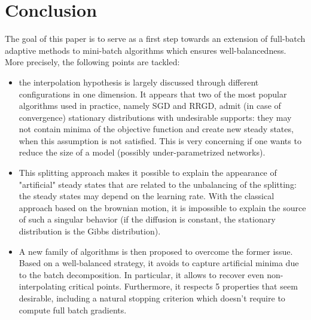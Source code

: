 \documentclass[article,authoryear,jmlmc]{beg_32}             %
\begin{document}
\section{Conclusion}
\label{section_conclusion}

The goal of this paper is to serve as a first step towards an extension of full-batch adaptive methods \cite{Bilel} to mini-batch algorithms which ensures well-balancedness.
More precisely, the following points are tackled:
\begin{itemize}
	\item the interpolation hypothesis is largely discussed through different configurations in one dimension. It appears that two of the most popular algorithms used in practice, namely SGD and RRGD, admit (in case of convergence) stationary distributions with undesirable supports: they may not contain minima of the objective function and create new steady states, when this assumption is not satisfied. This is very concerning if one wants to reduce the size of a model (possibly under-parametrized networks).
	\item 
          This
          splitting approach makes it possible to explain the appearance of "artificial" steady states that are related to the unbalancing of the splitting: the steady states may depend on the learning rate. With the classical approach based on the brownian motion, it is impossible to explain the source of such a singular behavior (if the diffusion is constant, the stationary distribution is the Gibbs distribution).
         \item A new family of algorithms is then proposed to overcome the former issue. Based on a well-balanced strategy, it avoids to capture artificial minima due to the batch
           decomposition. In particular, it allows to recover even non-interpolating critical points. Furthermore, it respects 5 properties that seem desirable, including a natural stopping
           criterion which doesn't require to compute full batch gradients. 
\end{itemize}
\end{document}
